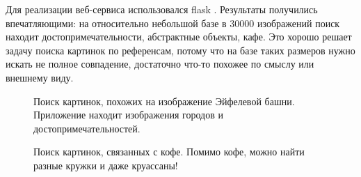 \documentclass[a4paper,12pt]{extarticle}
\begin{document}
Для реализации веб-сервиса использовался flask \cite{flask}. Результаты получились впечатляющими: на относительно небольшой базе в 30000 изображений поиск находит достопримечательности, абстрактные объекты, кафе. Это хорошо решает задачу поиска картинок по референсам, потому что на базе таких размеров нужно искать не полное совпадение, достаточно что-то похожее по смыслу или внешнему виду.

\begin{center}
\begin{figure}[H]
\caption{Поиск картинок, похожих на изображение Эйфелевой башни. Приложение находит изображения городов и достопримечательностей.}
\label{ris:simsearch_paris}
\end{figure}
\end{center}

\begin{center}
\begin{figure}[H]
\caption{Поиск картинок, связанных с кофе. Помимо кофе, можно найти разные кружки и даже круассаны!}
\label{ris:simsearch_coffee}
\end{figure}
\end{center}
\end{document}
